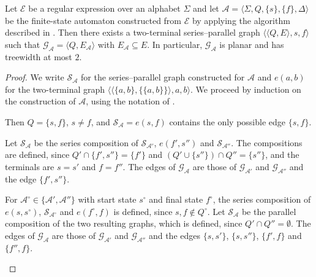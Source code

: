 \begin{proposition}\label{prop:thompson_series_parallel}
  Let $\mathcal{E}$ be a regular expression over an alphabet $\Sigma$ and let
  $\mathcal{A} = \langle \Sigma, Q, \{ s \}, \{ f \}, \Delta \rangle$ be the finite-state
  automaton constructed from $\mathcal{E}$ by applying the algorithm described in
  . Then there exists a two-terminal series--parallel graph
  $\langle \langle Q, E \rangle, s, f \rangle$ such that $\mathcal{G}_\mathcal{A} =
  \langle Q, E_\mathcal{A} \rangle$ with $E_\mathcal{A} \subseteq E$. In particular,
  $\mathcal{G}_\mathcal{A}$ is planar and has treewidth at most $2$.
\end{proposition}

\begin{proof}
  We write $\mathcal{S}_\mathcal{A}$ for the series--parallel graph constructed for
  $\mathcal{A}$ and $e(a, b)$ for the two-terminal graph $\langle \langle \{ a, b \}, \{
  \{ a, b \} \} \rangle, a, b \rangle$. We proceed by induction on the construction of
  $\mathcal{A}$, using the notation of .

  \begin{case}
    Then $Q = \{ s, f \}$, $s \neq f$, and $\mathcal{S}_\mathcal{A} = e(s, f)$ contains
    the only possible edge $\{ s, f \}$.
  \end{case}

  \begin{case}
    Let $\mathcal{S}_\mathcal{A}$ be the series composition of $\mathcal{S}_{\mathcal{A}'}$,
    $e(f', s'')$ and $\mathcal{S}_{\mathcal{A}''}$. The compositions are defined, since
    $Q' \cap \{ f', s'' \} = \{ f' \}$ and $(Q' \cup \{ s'' \}) \cap Q'' = \{ s'' \}$,
    and the terminals are $s = s'$ and $f = f''$. The edges of $\mathcal{G}_\mathcal{A}$
    are those of $\mathcal{G}_{\mathcal{A}'}$ and $\mathcal{G}_{\mathcal{A}''}$ and the edge
    $\{ f', s'' \}$.
  \end{case}

  \begin{case}
    For $\mathcal{A}^\circ \in \{ \mathcal{A}', \mathcal{A}'' \}$ with start state
    $s^\circ$ and final state $f^\circ$, the series composition of $e(s, s^\circ)$,
    $\mathcal{S}_{\mathcal{A}^\circ}$ and $e(f^\circ, f)$ is defined, since $s, f \not\in
    Q^\circ$. Let $\mathcal{S}_\mathcal{A}$ be the parallel composition of the two
    resulting graphs, which is defined, since $Q' \cap Q'' = \emptyset$. The edges of
    $\mathcal{G}_\mathcal{A}$ are those of $\mathcal{G}_{\mathcal{A}'}$ and
    $\mathcal{G}_{\mathcal{A}''}$ and the edges $\{ s, s' \}$, $\{ s, s'' \}$, $\{ f', f \}$
    and $\{ f'', f \}$.
  \end{case}


\end{proof}
